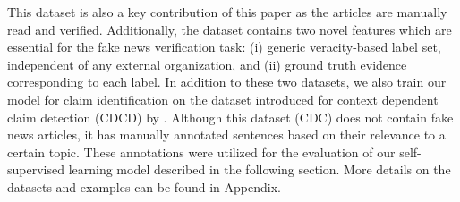 \documentclass[11pt,a4paper]{article}
\begin{document}
{\indent This dataset is also a key contribution of this paper as the articles are manually read and verified. Additionally, the dataset contains two novel features which are essential for the fake news verification task: (i) generic veracity-based label set, independent of any external organization, and (ii) ground truth evidence corresponding to each label. 
}\newline
{
\indent In addition to these two datasets, we also train our model for claim identification on the dataset introduced for context dependent claim detection (CDCD) by \citet{levy_context_2014}. Although this dataset (CDC) does not contain fake news articles, it has manually annotated sentences based on their relevance to a certain topic. These annotations were utilized for the evaluation of our self-supervised learning model described in the following section. More details on the datasets and examples can be found in Appendix.
}
\end{document}

